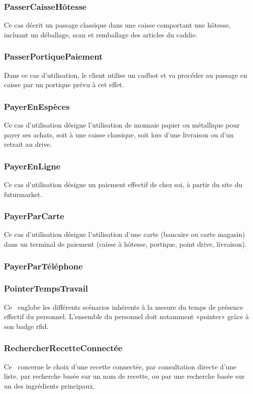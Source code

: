 \subsubsection{PasserCaisseHôtesse}
Ce cas décrit un passage classique dans une caisse comportant une hôtesse, incluant un déballage, scan et remballage des articles du caddie.

\subsubsection{PasserPortiquePaiement}
Dans ce cas d'utilisation, le client utilise un cadbot et va procéder au passage en caisse par un portique prévu à cet effet. 

\subsubsection{PayerEnEspèces}
Ce cas d'utilisation désigne l'utilisation de monnaie papier ou métallique pour payer ses achats, soit à une caisse classique, soit lors d'une livraison ou d'un retrait au drive.

\subsubsection{PayerEnLigne}
Ce cas d'utilisation désigne un paiement effectif de chez soi, à partir du site du futurmarket.

\subsubsection{PayerParCarte}
Ce cas d'utilisation désigne l'utilisation d'une carte (bancaire ou carte magasin) dans un terminal de paiement (caisse à hôtesse, portique, point drive, livraison).

\subsubsection{PayerParTéléphone}
\TODO

\subsubsection{PointerTempsTravail}
Ce \cu\ englobe les différents scénarios inhérents à la mesure du temps de présence effectif du personnel.
L'ensemble du personnel doit notamment «pointer» grâce à son badge rfid.

\subsubsection{RechercherRecetteConnectée}
Ce \cu\ concerne le choix d'une recette connectée, par consultation directe d'une liste, par recherche basée sur un nom de recette, ou par une recherche basée sur un des ingrédients principaux.

